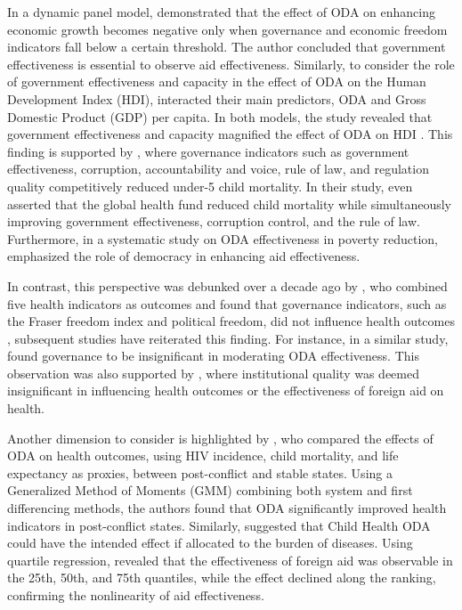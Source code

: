 In a dynamic panel model, \textcite{abate_relationship_2022} demonstrated that the effect of ODA on enhancing economic growth becomes negative only when governance and economic freedom indicators fall below a certain threshold. The author concluded that government effectiveness is essential to observe aid effectiveness. Similarly, to consider the role of government effectiveness and capacity in the effect of ODA on the Human Development Index (HDI), \textcite{chung_economic_2022} interacted their main predictors, ODA and Gross Domestic Product (GDP) per capita. In both models, the study revealed that government effectiveness and capacity magnified the effect of ODA on HDI \parencite{chung_economic_2022}. This finding is supported by \textcite{muhammad_health_2021}, where governance indicators such as government effectiveness, corruption, accountability and voice, rule of law, and regulation quality competitively reduced under-5 child mortality. In their study, \textcite{kavanagh_governance_2019} even asserted that the global health fund reduced child mortality while simultaneously improving government effectiveness, corruption control, and the rule of law. Furthermore, in a systematic study on ODA effectiveness in poverty reduction, \textcite{mahembe_foreign_2019} emphasized the role of democracy in enhancing aid effectiveness.

In contrast, this perspective was debunked over a decade ago by \textcite{williamson_foreign_2008}, who combined five health indicators as outcomes and found that governance indicators, such as the Fraser freedom index and political freedom, did not influence health outcomes \parencite{williamson_foreign_2008}, subsequent studies have reiterated this finding. For instance, in a similar study, \textcite{david_contribution_2017} found governance to be insignificant in moderating ODA effectiveness. This observation was also supported by \textcite{ali_foreign_2020}, where institutional quality was deemed insignificant in influencing health outcomes or the effectiveness of foreign aid on health.

Another dimension to consider is highlighted by \textcite{yogo_health_2015}, who compared the effects of ODA on health outcomes, using HIV incidence, child mortality, and life expectancy as proxies, between post-conflict and stable states. Using a Generalized Method of Moments (GMM) combining both system and first differencing methods, the authors found that ODA significantly improved health indicators in post-conflict states. Similarly, \textcite{bavinger_relationship_2017} suggested that Child Health ODA could have the intended effect if allocated to the burden of diseases. Using quartile regression, \textcite{mohamed_foreign_2017} revealed that the effectiveness of foreign aid was observable in the 25th, 50th, and 75th quantiles, while the effect declined along the ranking, confirming the nonlinearity of aid effectiveness.



